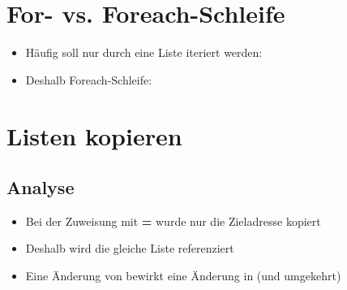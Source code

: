 \livecoding

\section{For- vs. Foreach-Schleife}
\begin{frame}
	\slidehead

	\begin{itemize}
		\item Häufig soll nur durch eine Liste iteriert werden:
		\pause

		\item Deshalb Foreach-Schleife:
	\end{itemize}
\end{frame}

\section{Listen kopieren}
\begin{frame}
	\slidehead
\end{frame}


\subsection{Analyse}
\begin{frame}
	\slidehead
	\vspace{2ex}
	\centering

	\vspace{2ex}
	\begin{itemize}
		\item Bei der Zuweisung mit \textbf{=} wurde nur die Zieladresse
		kopiert
		\item Deshalb wird die gleiche Liste referenziert
		\item Eine Änderung von  bewirkt eine Änderung in  (und umgekehrt)
	\end{itemize}
\end{frame}


